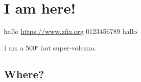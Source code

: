 \chapter{I am here!}
\label{chap:here}
\blindtext

hallo \url{https://www.zfix.org} 0123456789 hallo

\begin{definition}
    I am a $500\si{\degree}$ hot super-volcano.
\end{definition}

\blindtext

\blindtext

\section{Where?}
\label{sec:where_}
\blindtext

\blindtext

\blindtext

\blindtext

\blindtext

\blindtext

\blindtext

\blindtext

\blindtext

